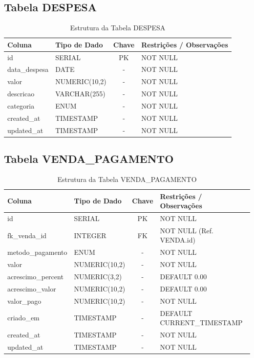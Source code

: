 \documentclass[
	12pt,				%
	openany,			%
	oneside,			%
	a4paper,			%
	english,			%
	french,				%
	spanish,			%
	brazil				%
	]{abntex2}
\begin{document}
\begin{apendicesenv}
\subsection{Tabela DESPESA}
\begin{table}[H]
\centering
\caption{Estrutura da Tabela DESPESA}
\begin{tabular}{|l|p{4cm}|c|p{6cm}|}
\hline
\textbf{Coluna} & \textbf{Tipo de Dado} & \textbf{Chave} & \textbf{Restrições / Observações} \\ \hline
id & SERIAL & PK & NOT NULL \\ \hline
data\_despesa & DATE & - & NOT NULL \\ \hline
valor & NUMERIC(10,2) & - & NOT NULL \\ \hline
descricao & VARCHAR(255) & - & NOT NULL \\ \hline
categoria & ENUM & - & NOT NULL \\ \hline
created\_at & TIMESTAMP & - & NOT NULL \\ \hline
updated\_at & TIMESTAMP & - & NOT NULL \\ \hline
\end{tabular}
\end{table}

\subsection{Tabela VENDA\_PAGAMENTO}
\begin{table}[H]
\centering
\caption{Estrutura da Tabela VENDA\_PAGAMENTO}
\begin{tabular}{|l|p{4cm}|c|p{6cm}|}
\hline
\textbf{Coluna} & \textbf{Tipo de Dado} & \textbf{Chave} & \textbf{Restrições / Observações} \\ \hline
id & SERIAL & PK & NOT NULL \\ \hline
fk\_venda\_id & INTEGER & FK & NOT NULL (Ref. VENDA.id) \\ \hline
metodo\_pagamento & ENUM & - & NOT NULL \\ \hline
valor & NUMERIC(10,2) & - & NOT NULL \\ \hline
acrescimo\_percent & NUMERIC(3,2) & - & DEFAULT 0.00 \\ \hline
acrescimo\_valor & NUMERIC(10,2) & - & DEFAULT 0.00 \\ \hline
valor\_pago & NUMERIC(10,2) & - & NOT NULL \\ \hline
criado\_em & TIMESTAMP & - & DEFAULT CURRENT\_TIMESTAMP \\ \hline
created\_at & TIMESTAMP & - & NOT NULL \\ \hline
updated\_at & TIMESTAMP & - & NOT NULL \\ \hline
\end{tabular}
\end{table}


\end{apendicesenv}
\end{document}
